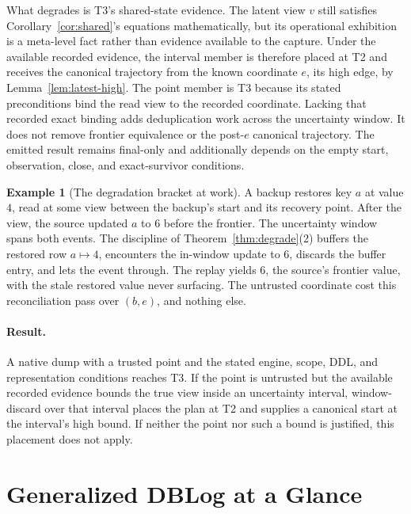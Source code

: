 \documentclass[sigconf,nonacm,10pt]{acmart}
\theoremstyle{plain}
\theoremstyle{definition}
\newtheorem{example}{Example}[section]
\begin{document}
What degrades is T3's shared-state evidence. The latent view
$v$ still satisfies Corollary~\ref{cor:shared}'s equations
mathematically, but its operational exhibition is a meta-level fact
rather than evidence available to the capture. Under the available
recorded evidence, the interval member is therefore placed at T2 and
receives the canonical trajectory from the known coordinate $e$,
its high edge, by Lemma~\ref{lem:latest-high}. The point member is T3
because its stated preconditions bind the read view to the recorded
coordinate. Lacking that recorded exact binding adds deduplication work
across the uncertainty window. It does not remove frontier equivalence
or the post-$e$ canonical trajectory. The emitted result remains
final-only and additionally depends on the empty start, observation,
close, and exact-survivor conditions.

\begin{example}[The degradation bracket at work]\label{ex:degrade}
A backup restores key $a$ at value $4$, read at some view between
the backup's start and its recovery point. After the view, the
source updated $a$ to $6$ before the frontier. The uncertainty
window spans both events. The discipline of
Theorem~\ref{thm:degrade}(2) buffers the restored row $a \mapsto
4$, encounters the in-window update to $6$, discards the buffer
entry, and lets the event through. The replay yields $6$, the
source's frontier value, with the stale restored value never
surfacing. The untrusted coordinate cost this
reconciliation pass over $(b, e)$, and nothing else.
\end{example}

\paragraph{Result.}
A native dump with a trusted point and the stated engine,
scope, DDL, and representation conditions reaches T3. If the point
is untrusted but the available recorded evidence bounds the true view
inside an uncertainty interval, window-discard over that interval
places the plan at T2 and supplies a canonical start at the
interval's high bound. If neither
the point nor such a bound is justified, this placement does not
apply.


\FloatBarrier

\section{Generalized DBLog at a Glance}\label{sec:practitioner}
\end{document}
